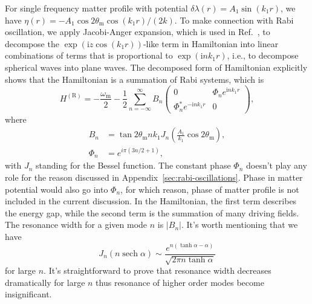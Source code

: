 \documentclass[%
reprint,
 amsmath,amssymb,
 prd,
]{revtex4-1}
\newcommand{\sech}[1]{{\operatorname{sech}{#1}}}
\newcommand{\ri}{\mathrm{i}}
\begin{document}
For single frequency matter profile with potential $\delta\lambda(r) = A_1\sin(k_1 r)$, we have $\eta(r) = - A_1 \cos 2\theta_{\mathrm m} \cos (k_1 r)/(2 k) $. To make connection with Rabi oscillation, we apply Jacobi-Anger expansion, which is used in Ref.~, to decompose the $\exp\left( \ri z \cos\left(k_1 r \right) \right)$-like term in Hamiltonian into linear combinations of terms that is proportional to $\exp\left(\ri n k_1 r \right)$, i.e., to decompose spherical waves into plane waves. The decomposed form of Hamiltonian explicitly shows that the Hamiltonian is a summation of Rabi systems, which is
\begin{equation*}
    H^{(\mathrm{R})} = 
    -\frac{\omega_{\mathrm{m}}}{2} 
    -  \frac{1}{2} \sum_{n=-\infty}^\infty B_n \begin{pmatrix}
    0 &  \Phi_n e^{\ri n k_1  r} \\
     \Phi_n^* e^{ - \ri n k_1 r} & 0
    \end{pmatrix},
\end{equation*}
where
\begin{align*}
    B_n &= \tan 2\theta_{\mathrm m} n k_1 J_{n} \left( \frac{A_1}{k_1}\cos 2\theta_{\mathrm m} \right),\\
    \Phi_n &= e^{i\pi (3n/2+1)},
\end{align*}
with $J_n$ standing for the Bessel function.
The constant phase $\Phi_n$ doesn't play any role for the reason discussed in Appendix~\ref{sec:rabi-oscillations}. Phase in matter potential would also go into $\Phi_n$, for which reason, phase of matter profile is not included in the current discussion. In the Hamiltonian, the first term describes the energy gap, while the second term is the summation of many driving fields. The resonance width for a given mode $n$ is $\lvert B_{n}\rvert$. It's worth mentioning that we have~\cite{Ploumistakis20092897}
\begin{equation}
J_n(n \sech \alpha) \sim \frac{ e^{n(\tanh\alpha - \alpha)} }{\sqrt{ 2\pi n \tanh \alpha } }
\end{equation}
for large $n$. It's straightforward to prove that resonance width decreases dramatically for large $n$ thus resonance of higher order modes become insignificant.
\end{document}
